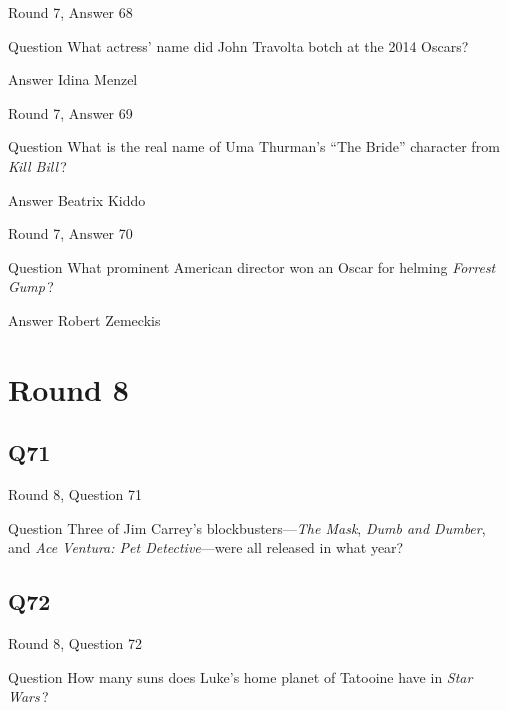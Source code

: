 \documentclass[11pt]{beamer}
\begin{document}
\begin{frame}[t]{Round 7, Answer 68}
\vspace{2em}
\begin{block}{Question}
What actress' name did John Travolta botch at the 2014 Oscars?
\end{block}
\pause{}
\begin{block}{Answer}
Idina Menzel
\end{block}
\end{frame}
    

\begin{frame}[t]{Round 7, Answer 69}
\vspace{2em}
\begin{block}{Question}
What is the real name of Uma Thurman's ``The Bride'' character from \emph{Kill Bill}\,?
\end{block}
\pause{}
\begin{block}{Answer}
Beatrix Kiddo
\end{block}
\end{frame}
    

\begin{frame}[t]{Round 7, Answer 70}
\vspace{2em}
\begin{block}{Question}
What prominent American director won an Oscar for helming \emph{Forrest Gump}\,?
\end{block}
\pause{}
\begin{block}{Answer}
Robert Zemeckis
\end{block}
\end{frame}
    

\section{Round 8}
    

\subsection*{Q71}
\begin{frame}[t]{Round 8, Question 71}
\vspace{2em}
\begin{block}{Question}
Three of Jim Carrey's blockbusters—\emph{The Mask}, \emph{Dumb and Dumber}, and \emph{Ace Ventura: Pet Detective}—were all released in what year?
\end{block}
\end{frame}
    

\subsection*{Q72}
\begin{frame}[t]{Round 8, Question 72}
\vspace{2em}
\begin{block}{Question}
How many suns does Luke's home planet of Tatooine have in \emph{Star Wars}\,?
\end{block}
\end{frame}
    
\end{document}
